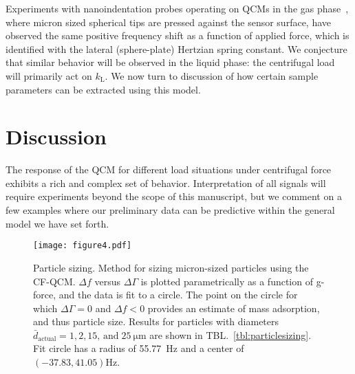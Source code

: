 \documentclass[floatfix,superscriptaddress,a4paper,twocolumn]{revtex4-1}
\newcommand{\Table}[1]{TBL.~\ref{#1}}
\newcommand{\df}{\Delta\!f}
\newcommand{\dg}{\Delta\Gamma}
\newcommand{\kl}{k_\mathrm{L}}
\begin{document}

Experiments with nanoindentation probes operating on QCMs in the gas
phase~\cite{borovsky2001measuring}, where micron sized spherical tips are
pressed against the sensor surface, have observed the same positive
frequency shift as a function of applied force,  which is identified with
the lateral (sphere-plate) Hertzian spring constant.  We conjecture that
similar behavior will be observed in the liquid phase: the centrifugal load
will primarily act on $\kl$.  We now turn to discussion of how certain
sample parameters can be extracted using this model.

\section*{Discussion}
\label{sec:discussion}
The response of the QCM for different load situations under centrifugal
force exhibits a rich and complex set of behavior. Interpretation of all
signals will require experiments beyond the scope of this
manuscript, but we comment on a few examples where our
preliminary data can be predictive within the general model we have set forth.

\begin{figure}[ht]
\centering
\texttt{[image: figure4.pdf]}
\caption{ Particle sizing.  Method for sizing micron-sized particles using the CF-QCM. 
$\df$ versus $\dg$ is plotted parametrically as a function of g-force, and
the data is fit to a circle.  The point on the circle for which $\dg=0$ and
$\df<0$ provides an estimate of mass adsorption, and thus particle size.
Results for particles with diameters $\bar{d}_\mathrm{actual}=1, 2,
15,\,\mathrm{and}\;\SI{25}{\micro\meter}$ are shown in
\Table{tbl:particlesizing}.  Fit circle has a radius of \SI{55.77}{\hertz} and
a center of $(-37.83,41.05) \si{\hertz}$. }
\label{fig:circlefit}
\end{figure}
\end{document}

